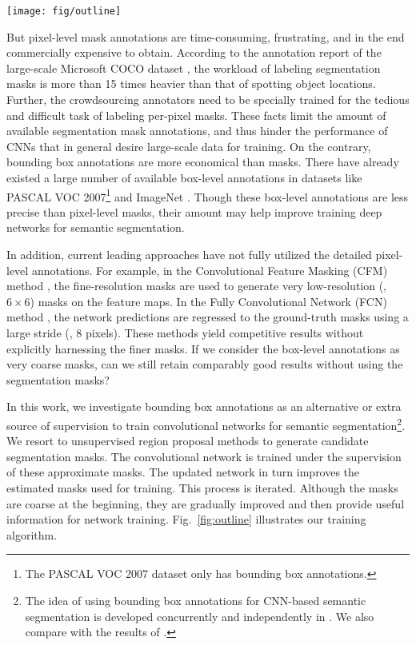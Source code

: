 \documentclass[10pt,twocolumn,letterpaper]{article}
\begin{document}
\begin{figure*}[t]
	\centering
	\texttt{[image: fig/outline]}
	\caption{Overview of our training approach supervised by bounding boxes.}
	\label{fig:outline}
\end{figure*}

But pixel-level mask annotations are time-consuming, frustrating, and in the end commercially expensive to obtain.
According to the annotation report of the large-scale Microsoft COCO dataset \cite{Lin2014}, the workload of labeling segmentation masks is more than 15 times heavier than that of spotting object locations. Further, the crowdsourcing annotators need to be specially trained for the tedious and difficult task of labeling per-pixel masks. These facts limit the amount of available segmentation mask annotations, and thus hinder the performance of CNNs that in general desire large-scale data for training. On the contrary, bounding box annotations are more economical than masks. There have already existed a large number of available box-level annotations in datasets like PASCAL VOC 2007\footnote{The PASCAL VOC 2007 dataset only has bounding box annotations.} \cite{everingham2010pascal} and ImageNet \cite{Russakovsky2014}. Though these box-level annotations are less precise than pixel-level masks, their amount may help improve training deep networks for semantic segmentation.

In addition, current leading approaches have not fully utilized the detailed pixel-level annotations. For example, in the Convolutional Feature Masking (CFM) method \cite{Dai2015}, the fine-resolution masks are used to generate very low-resolution (\eg, $6 \times 6$) masks on the feature maps. In the Fully Convolutional Network (FCN) method \cite{Long2015}, the network predictions are regressed to the ground-truth masks using a large stride (\eg, 8 pixels). These methods yield competitive results without explicitly harnessing the finer masks. If we consider the box-level annotations as very coarse masks, can we still retain comparably good results without using the segmentation masks?

In this work, we investigate bounding box annotations as an alternative or extra source of supervision to train convolutional networks for semantic segmentation\footnote{The idea of using bounding box annotations for CNN-based semantic segmentation is developed concurrently and independently in \cite{papandreou2015weakly}. We also compare with the results of \cite{papandreou2015weakly}.}.
We resort to unsupervised region proposal methods \cite{uijlings2013selective,arbelaez2014multiscale} to generate candidate segmentation masks. The convolutional network is trained under the supervision of these approximate masks. The updated network in turn improves the estimated masks used for training. This process is iterated. Although the masks are coarse at the beginning, they are gradually improved and then provide useful information for network training. Fig.~\ref{fig:outline} illustrates our training algorithm.
\end{document}
